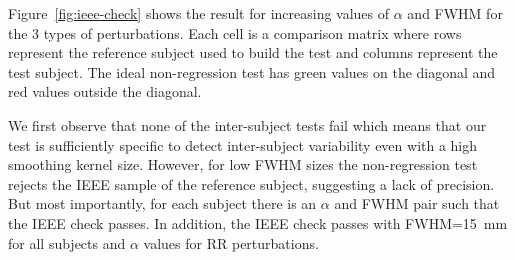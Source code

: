\documentclass{article}
\begin{document}
Figure~\ref{fig:ieee-check} shows the result for increasing values of $\alpha$ and FWHM for the 3 types of perturbations. 
Each cell is a comparison matrix where rows represent the reference subject used to build the test and columns represent 
the test subject. The ideal non-regression test has green values on the diagonal and red values outside the diagonal.

We first observe that none of the inter-subject tests fail which means 
that our test is sufficiently specific to detect
 inter-subject variability even with a high smoothing kernel size. However, for low FWHM sizes the non-regression test rejects the IEEE sample of the reference subject, 
 suggesting a lack of precision. But most importantly, for each subject there is an $\alpha$ and FWHM pair
  such that the IEEE check passes. In addition, the IEEE check passes with FWHM=15~mm for all subjects and $\alpha$ values for RR perturbations.
\end{document}
